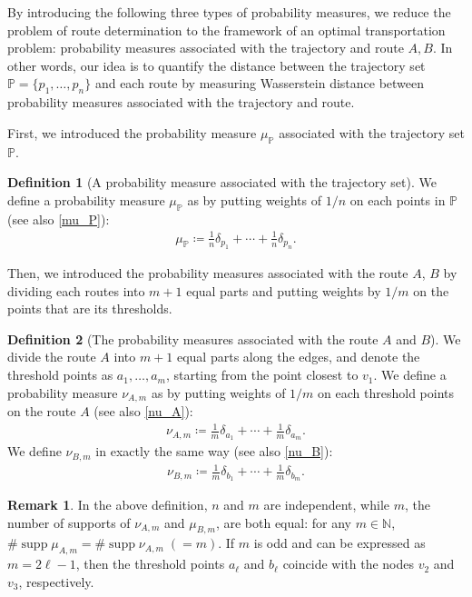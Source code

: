 \documentclass{article}
\numberwithin{equation}{section}
\theoremstyle{definition}
\newtheorem{definition}{Definition}[section]
\newtheorem{remark}[remark]{Remark}
\newcommand{\de}{\delta}
\newcommand{\N}{\mathbb{N}}
\DeclareMathOperator\supp{supp} %
\def\:={\coloneqq} %
\begin{document}
By introducing the following three types of probability measures, we reduce the problem of route determination to the framework of an optimal transportation problem: probability measures associated with the trajectory and route $A,B$.
In other words, our idea is to quantify the distance between the trajectory set $\mathbb{P}=\{p_1,\ldots,p_n\}$ and each route by measuring Wasserstein distance between probability measures associated with the trajectory and route.

First, we introduced the probability measure $\mu_\mathbb{P}$ associated with the trajectory set $\mathbb{P}$.

\begin{definition}[A probability measure associated with the trajectory set]
We define a probability measure $\mu_\mathbb{P}$ as by putting weights of $1/n$ on each points in $\mathbb{P}$ (see also \autoref{mu_P}):
\begin{align}
    \mu_\mathbb{P} \:= \frac{1}{n}\de_{p_1}+\cdots+\frac{1}{n}\de_{p_n}. 
\end{align}
\end{definition}

Then, we introduced the probability measures associated with the route $A$, $B$ by dividing each routes into $m+1$ equal parts and putting weights by $1/m$ on the points that are its thresholds. 

\begin{definition}[The probability measures associated with the route $A$ and $B$]
We divide the route $A$ into $m+1$ equal parts along the edges, and denote the threshold points as $a_1,\ldots,a_m$, starting from the point closest to $v_1$.
We define a probability measure $\nu_{A,m}$ as by putting weights of $1/m$ on each threshold points on the route $A$ (see also \autoref{nu_A}):
\begin{align}
    \nu_{A,m} \:= \frac{1}{m}\de_{a_1}+\cdots+\frac{1}{m}\de_{a_m}. 
\end{align}
We define $\nu_{B,m}$ in exactly the same way (see also \autoref{nu_B}):
\begin{align}
    \nu_{B,m} \:= \frac{1}{m}\de_{b_1}+\cdots+\frac{1}{m}\de_{b_m}.
\end{align}
\end{definition}

\begin{remark}
In the above definition, $n$ and $m$ are independent, while $m$, the number of supports of $\nu_{A,m}$ and $\mu_{B,m}$, are both equal: 
for any $m\in\N$, $\#\supp\mu_{A,m}=\#\supp\nu_{A,m}\;(=m)$.
If $m$ is odd and can be expressed as $m=2\ell-1$, then the threshold points $a_\ell$ and $b_\ell$ coincide with the nodes $v_2$ and $v_3$, respectively.
\end{remark}
\end{document}
